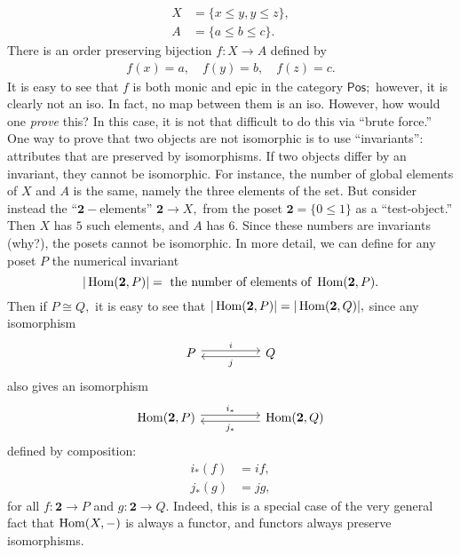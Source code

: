 \begin{align*} 
	X &= \{x\le y, y\le z\},\\
	A &= \{a \le b \le c\}.
\end{align*}
There is an order preserving bijection $f:X \to A$ defined by
\begin{align*} 
	f(x) = a, \quad f(y) = b, \quad f(z) = c.
\end{align*}
It is easy to see that $f$ is both monic and epic in the category $\mathsf{Pos};$ however, it is clearly not an iso. In fact, no map between them is an iso. However, how would one \emph{prove} this? In this case, it is not that difficult to do this via ``brute force.''\\
One way to prove that two objects are not isomorphic is to use ``invariants'': attributes that are preserved by isomorphisms. If two objects differ by an invariant, they cannot be isomorphic. For instance, the number of global elements of $X$ and $A$ is the same, namely the three elements of the set. But consider instead the ``$\mathbf{2}-$elements'' $\mathbf{2} \to X,$ from the poset $\mathbf{2} = \{0 \le 1\}$ as a ``test-object.'' Then $X$ has $5$ such elements, and $A$ has $6.$ Since these numbers are invariants (why?), the posets cannot be isomorphic. In more detail, we can define for any poset $P$ the numerical invariant
\begin{equation*} 
	|\operatorname{Hom}(\mathbf{2}, P)| = \text{ the number of elements of }\operatorname{Hom}(\mathbf{2}, P).
\end{equation*}
Then if $P \cong Q,$ it is easy to see that $|\operatorname{Hom}(\mathbf{2}, P)| = |\operatorname{Hom}(\mathbf{2}, Q)|,$ since any isomorphism
\begin{equation*} 
	\begin{tikzcd}
		P \arrow[rr, "i", shift left = 1] && Q \arrow[ll, "j", shift left = 1]
	\end{tikzcd}
\end{equation*}
also gives an isomorphism
\begin{equation*} 
	\begin{tikzcd}
		\Hom(\mathbf{2}, P) \arrow[rr, "i_*", shift left = 1] && \Hom(\mathbf{2}, Q) \arrow[ll, "j_*", shift left = 1]
	\end{tikzcd}
\end{equation*}
defined by composition:
\begin{align*} 
	i_*(f) &= if,\\
	j_*(g) &= jg,
\end{align*}
for all $f:\mathbf{2} \to P$ and $g:\mathbf{2} \to Q.$ Indeed, this is a special case of the very general fact that $\operatorname{Hom}(X,- )$ is always a functor, and functors always preserve isomorphisms.
